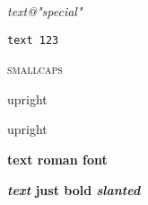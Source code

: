 \documentclass[12pt]{article}
\newcommand\"{quote}
\begin{document}
\textit{text@"special"}

\texttt{text 123}

\textsc{smallcaps}

\textup{upright}


\textmd{upright}


\textbf{text \textrm{roman font}}

\textbf{\textit{text} just bold \textsl{slanted}}
\end{document}
